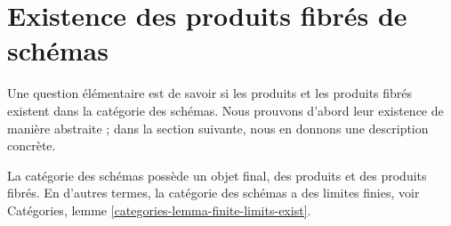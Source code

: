 \section{Existence des produits fibrés de schémas}
\label{section-existence-fibre-products}

\noindent
Une question élémentaire est de savoir si les produits et les
produits fibrés existent dans la catégorie des schémas. Nous
prouvons d'abord leur existence de manière abstraite ;
dans la section suivante, nous en donnons une
description concrète.

\begin{lemma}
\label{lemma-fibre-products}
La catégorie des schémas possède un objet final, des produits et des produits
fibrés. En d'autres termes, la catégorie des schémas a des limites finies,
voir Catégories, lemme \ref{categories-lemma-finite-limits-exist}.
\end{lemma}

